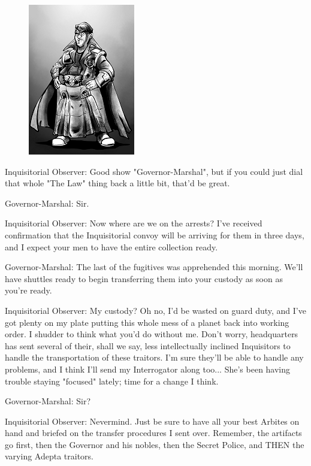 

\begin{figure}
	\begin{center}
		\includegraphics[width=\figwidth]{pics/20/3.png}
	\end{center}
\end{figure}



Inquisitorial Observer: 
Good show "Governor-Marshal", but if you could just dial that whole "The Law" thing back a little bit, that'd be great.

Governor-Marshal: 
Sir.

Inquisitorial Observer: 
Now where are we on the arrests? 
I've received confirmation that the Inquisitorial convoy will be arriving for them in three days, and I expect your men to have the entire collection ready.

Governor-Marshal: 
The last of the fugitives was apprehended this morning. 
We'll have shuttles ready to begin transferring them into your custody as soon as you're ready.

Inquisitorial Observer: 
My custody? 
Oh no, I'd be wasted on guard duty, and I've got plenty on my plate putting this whole mess of a planet back into working order. 
I shudder to think what you'd do without me. 
Don't worry, headquarters has sent several of their, shall we say, less intellectually inclined Inquisitors to handle the transportation of these traitors. 
I'm sure they'll be able to handle any problems, and I think I'll send my Interrogator along too... 
She's been having trouble staying "focused" lately; 
time for a change I think.

Governor-Marshal: 
Sir?

Inquisitorial Observer: 
Nevermind. 
Just be sure to have all your best Arbites on hand and briefed on the transfer procedures I sent over. 
Remember, the artifacts go first, then the Governor and his nobles, then the Secret Police, and THEN the varying Adepta traitors.

